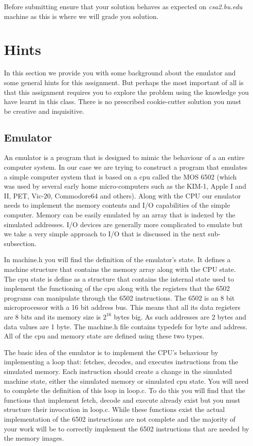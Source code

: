 \documentclass[11pt]{article}
\begin{document}
{Before submitting ensure that your solution behaves as expected on  \emph{csa2.bu.edu} 
machine as this is where we will grade you solution.  


\section{Hints}

In this section we provide you with some background about the emulator
and some general hints for this assignment.  But perhaps the most
important of all is that this assignment requires you to explore the
problem using the knowledge you have learnt in this class.  There is
no prescribed cookie-cutter solution you must be creative and
inquisitive.

\subsection{Emulator}

An emulator is a program that is designed to mimic the behaviour of a
an entire computer system.  In our case we are trying to construct a
program that emulates a simple computer system that is based on a cpu
called the MOS 6502 (which was used by several early home
micro-computers such as the KIM-1, Apple I and II, PET, Vic-20, Commodore64 and
others).  Along with the CPU our emulator needs to implement the
memory contents and I/O capabilities of the simple computer.  Memory
can be easily emulated by an array that is indexed by the simulated
addresses.  I/O devices are generally more complicated
to emulate but we take a very simple approach to I/O that is discussed
in the next sub-subsection. 

In machine.h you will find the definition of the emulator's state.  It
defines a machine structure that contains the memory array along with the
CPU state.  The cpu state is define as a structure that contains the
internal state used to implement the functioning of the cpu along with
the registers that the 6502 programs can manipulate
through the 6502 instructions.   The 6502 is an 8 bit microprocessor with a
16 bit address bus.  This means that all its data registers are 8 bits
and its memory size is $2^{16}$ bytes big.  As such
addresses are 2 bytes and data values are 1 byte.  The machine.h file
contains typedefs for byte and address.   All of the cpu and memory state are
defined using these two types.   

The basic idea of the emulator is to implement the CPU's behaviour by
implementing a loop that: fetches, decodes, and executes instructions
from the simulated memory.  Each instruction should create a change in
the simulated machine state, either the simulated memory or simulated
cpu state.  You will need to complete the definition
of this loop in loop.c.  To do this you will find that the functions
that implement fetch, decode and execute already exist but you must
structure their invocation in loop.c.  While these functions exist the
actual implementation of the 6502 instructions are not complete and
the majority of your work will be to correctly implement the 6502
instructions that are needed by the memory images.  

}
\end{document}
